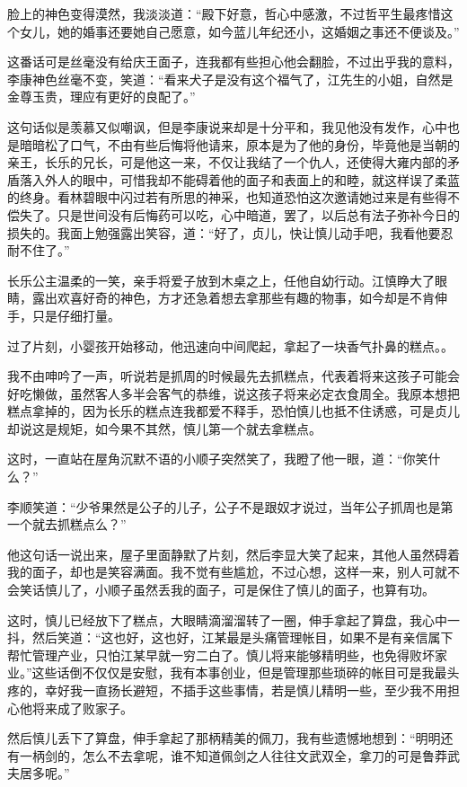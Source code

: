 脸上的神色变得漠然，我淡淡道：“殿下好意，哲心中感激，不过哲平生最疼惜这个女儿，她的婚事还要她自己愿意，如今蓝儿年纪还小，这婚姻之事还不便谈及。”

这番话可是丝毫没有给庆王面子，连我都有些担心他会翻脸，不过出乎我的意料，李康神色丝毫不变，笑道：“看来犬子是没有这个福气了，江先生的小姐，自然是金尊玉贵，理应有更好的良配了。”

这句话似是羡慕又似嘲讽，但是李康说来却是十分平和，我见他没有发作，心中也是暗暗松了口气，不由有些后悔将他请来，原本是为了他的身份，毕竟他是当朝的亲王，长乐的兄长，可是他这一来，不仅让我结了一个仇人，还使得大雍内部的矛盾落入外人的眼中，可惜我却不能碍着他的面子和表面上的和睦，就这样误了柔蓝的终身。看林碧眼中闪过若有所思的神采，也知道恐怕这次邀请她过来是有些得不偿失了。只是世间没有后悔药可以吃，心中暗道，罢了，以后总有法子弥补今日的损失的。我面上勉强露出笑容，道：“好了，贞儿，快让慎儿动手吧，我看他要忍耐不住了。”

长乐公主温柔的一笑，亲手将爱子放到木桌之上，任他自幼行动。江慎睁大了眼睛，露出欢喜好奇的神色，方才还急着想去拿那些有趣的物事，如今却是不肯伸手，只是仔细打量。

过了片刻，小婴孩开始移动，他迅速向中间爬起，拿起了一块香气扑鼻的糕点。。

我不由呻吟了一声，听说若是抓周的时候最先去抓糕点，代表着将来这孩子可能会好吃懒做，虽然客人多半会客气的恭维，说这孩子将来必定衣食周全。我原本想把糕点拿掉的，因为长乐的糕点连我都爱不释手，恐怕慎儿也抵不住诱惑，可是贞儿却说这是规矩，如今果不其然，慎儿第一个就去拿糕点。

这时，一直站在屋角沉默不语的小顺子突然笑了，我瞪了他一眼，道：“你笑什么？”

李顺笑道：“少爷果然是公子的儿子，公子不是跟奴才说过，当年公子抓周也是第一个就去抓糕点么？”

他这句话一说出来，屋子里面静默了片刻，然后李显大笑了起来，其他人虽然碍着我的面子，却也是笑容满面。我不觉有些尴尬，不过心想，这样一来，别人可就不会笑话慎儿了，小顺子虽然丢我的面子，可是保住了慎儿的面子，也算有功。

这时，慎儿已经放下了糕点，大眼睛滴溜溜转了一圈，伸手拿起了算盘，我心中一抖，然后笑道：“这也好，这也好，江某最是头痛管理帐目，如果不是有亲信属下帮忙管理产业，只怕江某早就一穷二白了。慎儿将来能够精明些，也免得败坏家业。”这些话倒不仅仅是安慰，我有本事创业，但是管理那些琐碎的帐目可是我最头疼的，幸好我一直扬长避短，不插手这些事情，若是慎儿精明一些，至少我不用担心他将来成了败家子。

然后慎儿丢下了算盘，伸手拿起了那柄精美的佩刀，我有些遗憾地想到：“明明还有一柄剑的，怎么不去拿呢，谁不知道佩剑之人往往文武双全，拿刀的可是鲁莽武夫居多呢。”

